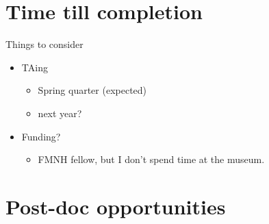 \documentclass{beamer}
\begin{document}
\section{Time till completion}
\begin{frame}
  \begin{block}{Things to consider}
    \begin{itemize}
      \item TAing
        \begin{itemize}
          \item Spring quarter (expected)
          \item next year?
        \end{itemize}
      \item Funding?
        \begin{itemize}
          \item FMNH fellow, but I don't spend time at the museum.
        \end{itemize}
    \end{itemize}
  \end{block}
\end{frame}

\section{Post-doc opportunities}
\end{document}
